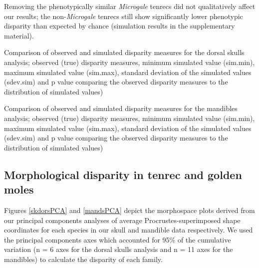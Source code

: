 \documentclass[12pt,a4paper]{article}
\begin{document}

Removing the phenotypically similar \textit{Microgale} tenrecs did not qualitatively affect our results; the non-\textit{Microgale} tenrecs still show significantly lower phenotypic disparity than expected by chance (simulation results in the supplementary material). 



\begin{table}[H]				

\centering
\caption{Comparison of observed and simulated disparity measures for the dorsal skulls analysis; observed (true) disparity measures, minimum simulated value (sim.min), maximum simulated value (sim.max), standard deviation of the simulated values (sdev.sim) and p value comparing the observed disparity measures to the distribution of simulated values)}


\label{skdorssims} %
\end{table}

\begin{table}[H]				

\centering
\caption{Comparison of observed and simulated disparity measures for the mandibles analysis; observed (true) disparity measures, minimum simulated value (sim.min), maximum simulated value (sim.max), standard deviation of the simulated values (sdev.sim) and p value comparing the observed disparity measures to the distribution of simulated values)}


\label{mandssims}
\end{table}

\subsection{Morphological disparity in tenrec and golden moles} 

Figures  \ref{skdorsPCA} and \ref{mandsPCA} depict the morphospace plots derived from our principal components analyses of average Procrustes-superimposed shape coordinates for each species in our skull and mandible data respectively. We used the principal components axes which accounted for 95\% of the cumulative variation (n = 6 axes for the dorsal skulls analysis and n = 11 axes for the mandibles) to calculate the disparity of each family. 
\end{document}
